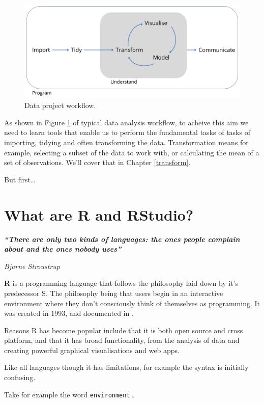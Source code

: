 \documentclass[12pt,]{book}
\theoremstyle{definition}
\theoremstyle{definition}
\theoremstyle{definition}
\theoremstyle{remark}
\begin{document}
\begin{figure}

{\centering \includegraphics[width=0.8\linewidth]{img/data_project_pipeline} 

}

\caption{Data project workflow.}\label{fig:pipeline}
\end{figure}

As shown in Figure \ref{fig:pipeline} of typical data analysis workflow,
to acheive this aim we need to learn tools that enable us to perform the
fundamental tasks of tasks of importing, tidying and often transforming
the data. Transformation means for example, selecting a subset of the
data to work with, or calculating the mean of a set of observations.
We'll cover that in Chapter \ref{transform}.

But first\ldots{}

\section{What are R and RStudio?}\label{r-rstudio}

\textbf{\emph{``There are only two kinds of languages: the ones people
complain about and the ones nobody uses''}}

\emph{Bjarne Stroustrup}

\textbf{R} is a programming language that follows the philosophy laid
down by it's predecessor S. The philosophy being that users begin in an
interactive environment where they don't consciously think of themselves
as programming. It was created in 1993, and documented in
\citep{ihaka1996}.

Reasons R has become popular include that it is both open source and
cross platform, and that it has broad functionality, from the analysis
of data and creating powerful graphical visualisations and web apps.

Like all languages though it has limitations, for example the syntax is
initially confusing.

Take for example the word \texttt{environment}\ldots{}
\end{document}
